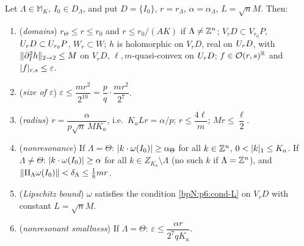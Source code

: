 \begin{proposition}\label{bpN:p9:block-hyp}
Let $\Lambda\in\mathbb M_K$, $I_0\in D_\Lambda$, and put $D=\{I_0\}$, $r=r_\Lambda$, $\alpha=\alpha_\Lambda$, $L=\sqrt nM$. Then:
\begin{enumerate}[label=(\alph*)]
\item (\emph{domains}) $r_\Theta\le r\le r_0$ and $r\le r_0/(AK)$ if $\Lambda\ne\mathbb{Z}^n$; $V_rD\subset V_{r_0}P$, $U_{r}D\subset U_{r_0}P$, $W_r\subset W$; $h$ is holomorphic on $V_rD$, real on $U_{r}D$, with $\lVert \partial_I^2h\rVert_{2\to2}\le M$ on $V_rD$, $\ell,m$-quasi-convex on $U_{r}D$; $f\in\mathcal O(r,s)^{\mathbb{R}}$ and $\lvert f\rvert_{r,s}\le\varepsilon$.
\item (\emph{size of $\varepsilon$}) $\varepsilon\le\dfrac{mr^2}{2^{10}}=\dfrac pq\cdot\dfrac{mr^2}{2^7}$.
\item (\emph{radius}) $r=\dfrac\alpha{p\sqrt n\,MK_a}$, i.e.\ $K_aLr=\alpha/p$; $r\le\dfrac{4\ell}m$; $Mr\le\dfrac\ell2$.
\item (\emph{nonresonance}) If $\Lambda=\Theta$: $\lvert k\cdot\omega(I_0)\rvert\ge\alpha_\Theta$ for all $k\in\mathbb{Z}^n$, $0<\lvert k\rvert_1\le K_a$. If $\Lambda\ne\Theta$: $\lvert k\cdot\omega(I_0)\rvert\ge\alpha$ for all $k\in Z_{K_a}\setminus\Lambda$ (no such $k$ if $\Lambda=\mathbb{Z}^n$), and $\lVert \Pi_\Lambda\omega(I_0)\rVert<\delta_\Lambda\le\frac18mr$.
\item (\emph{Lipschitz bound}) $\omega$ satisfies the condition \ref{bpN:p6:cond-L} on $V_rD$ with constant $L=\sqrt nM$.
\item (\emph{nonresonant smallness}) If $\Lambda=\Theta$: $\varepsilon\le\dfrac{\alpha r}{2^7qK_a}$.
\end{enumerate}
\end{proposition}
